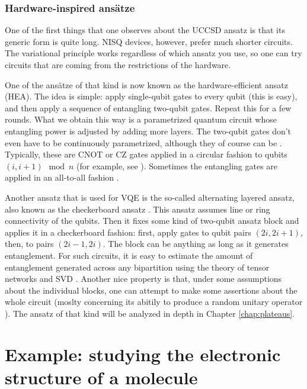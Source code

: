 \subsubsection{Hardware-inspired ans\"atze}

One of the first things that one observes about the UCCSD ansatz is that its generic form is quite long. NISQ devices, however, prefer much shorter circuits. The variational principle works regardless of which ansatz you use, so one can try circuits that are coming from the restrictions of the hardware. 

One of the ans\"atze of that kind is now known as the hardware-efficient ansatz (HEA)\cite{kandala_hardware-efficient_2017}. The idea is simple: apply single-qubit gates to every qubit (this is easy), and then apply a sequence of entangling two-qubit gates.  Repeat this for a few rounds. What we obtain this way is a parametrized quantum circuit whose entangling power is adjusted by adding more layers. The two-qubit gates don't even have to be continuously parametrized, although they of course can be \cite{campos_abrupt_2020}. Typically, these are CNOT or CZ gates applied in a circular fashion to qubits $(i, i+1) \mod n$ (for example, see \cite{mcclean_barren_2018}). Sometimes the entangling gates are applied in an all-to-all fashion \cite{skolik_layerwise_2020}.

Another ansatz that is used for VQE is the so-called alternating layered ansatz, also known as the checkerboard ansatz \cite{uvarov_machine_2020,bravo-prieto_scaling_2020,cerezo_cost-function-dependent_2020}. This ansatz assumes line or ring connectivity of the qubits. Then it fixes some kind of two-qubit ansatz block and applies it in a checkerboard fashion: first, apply gates to qubit pairs $(2i, 2i+1)$, then, to pairs $(2i -1 , 2i)$. The block can be anything as long as it generates entanglement. For such circuits, it is easy to estimate the amount of entanglement generated across any bipartition using the theory of tensor networks and SVD \cite{biamonte_lectures_2020}. Another nice property is that, under some assumptions about the individual blocks, one can attempt to make some assertions about the whole circuit (moslty concerning its abitily to produce a random unitary operator \cite{brandao_local_2016}). The ansatz of that kind will be analyzed in depth in Chapter \ref{chap:plateaus}.



\section{Example: studying the electronic structure of a molecule}

